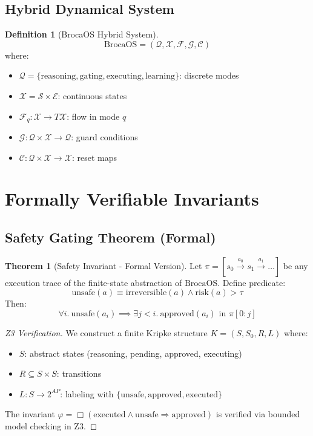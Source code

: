 \documentclass[12pt]{article}
\theoremstyle{definition}
\newtheorem{definition}{Definition}[section]
\newtheorem{theorem}{Theorem}[section]
\newcommand{\broca}{\text{BrocaOS}}
\newcommand{\trace}{\pi}
\begin{document}
\subsection{Hybrid Dynamical System}

\begin{definition}[BrocaOS Hybrid System]
\[
\broca = (\mathcal{Q}, \mathcal{X}, \mathcal{F}, \mathcal{G}, \mathcal{C})
\]
where:
\begin{itemize}
    \item $\mathcal{Q} = \{\text{reasoning}, \text{gating}, \text{executing}, \text{learning}\}$: discrete modes
    \item $\mathcal{X} = \mathcal{S} \times \mathcal{E}$: continuous states
    \item $\mathcal{F}_q: \mathcal{X} \to T\mathcal{X}$: flow in mode $q$
    \item $\mathcal{G}: \mathcal{Q} \times \mathcal{X} \to \mathcal{Q}$: guard conditions
    \item $\mathcal{C}: \mathcal{Q} \times \mathcal{X} \to \mathcal{X}$: reset maps
\end{itemize}
\end{definition}

\section{Formally Verifiable Invariants}

\subsection{Safety Gating Theorem (Formal)}

\begin{theorem}[Safety Invariant - Formal Version]
Let $\trace = [s_0 \xrightarrow{a_0} s_1 \xrightarrow{a_1} \dots]$ be any execution trace of the finite-state abstraction of $\broca$. Define predicate:
\[
\text{unsafe}(a) \equiv \text{irreversible}(a) \land \text{risk}(a) > \tau
\]
Then:
\[
\forall i.\ \text{unsafe}(a_i) \implies \exists j < i.\ \text{approved}(a_i) \text{ in } \trace[0:j]
\]
\end{theorem}

\begin{proof}[Z3 Verification]
We construct a finite Kripke structure $K = (S, S_0, R, L)$ where:
\begin{itemize}
    \item $S$: abstract states (reasoning, pending, approved, executing)
    \item $R \subseteq S \times S$: transitions
    \item $L: S \to 2^{AP}$: labeling with $\{\text{unsafe}, \text{approved}, \text{executed}\}$
\end{itemize}
The invariant $\varphi = \Box(\text{executed} \land \text{unsafe} \Rightarrow \text{approved})$ is verified via bounded model checking in Z3.
\end{proof}
\end{document}
